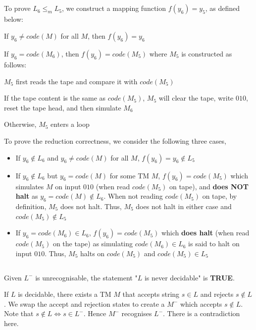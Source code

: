 \documentclass[12pt]{article}
\newcommand{\SubItem}[1]{
    {\setlength\itemindent{15pt} \item[-] #1}
}
\begin{document}
\subsection{}
To prove $L_6 \leq_m L_5$, we construct a mapping function $f(y_6) = y_5$, as defined below:
\begin{itemize}
    \item If $y_6 \neq code(M)$ for all $M$, then $f(y_6) = y_6$
    \item If $y_6 = code(M_6)$, then $f(y_6) = code(M_5)$ where $M_5$ is constructed as follows:
    \SubItem{$M_5$ first reads the tape and compare it with $code(M_5)$}
    \SubItem{If the tape content is the same as $code(M_5)$, $M_5$ will clear the tape, write $010$, reset the tape head, and then simulate $M_6$}
    \SubItem{Otherwise, $M_5$ enters a loop}
\end{itemize}

To prove the reduction correctness, we consider the following three cases,
\begin{itemize}
    \item If $y_6 \notin L_6$ and $y_6 \neq code(M)$ for all $M$, $f(y_6) = y_6 \notin L_5$
    \item If $y_6 \notin L_6$ but $y_6 = code(M)$ for some TM $M$, $f(y_6) = code(M_5)$ which simulates $M$ on input $010$ (when read $code(M_5)$ on tape), and \textbf{does NOT halt} as $y_6 = code(M) \notin L_6$. When not reading $code(M_5)$ on tape, by definition, $M_5$ does not halt. Thus, $M_5$ does not halt in either case and $code(M_5) \notin L_5$
    \item If $y_6 = code(M_6) \in L_6$, $f(y_6) = code(M_5)$ which \textbf{does halt} (when read $code(M_5)$ on the tape) as simulating $code(M_6) \in L_6$ is said to halt on input $010$. Thus, $M_5$ halts on $code(M_5)$ and $code(M_5) \in L_5$
\end{itemize}

\subsection{}

\subsubsection{}
Given $L^-$ is unrecognisable, the statement "$L$ is never decidable" is \textbf{TRUE}.

If $L$ is decidable, there exists a TM $M$ that accepts string $s \in L$ and rejects $s \notin L$. We swap the accept and rejection states to create a $M^-$ which accepts $s \notin L$. Note that $s \notin L \iff s \in L^-$. Hence $M^-$ recognises $L^-$. There is a contradiction here.
\end{document}
